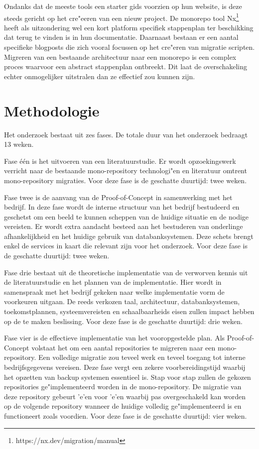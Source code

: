 \documentclass{hogent-article}
\begin{document}
Ondanks dat de meeste tools een starter gids voorzien op hun website, is deze steeds gericht op het cre"eeren van een nieuw project. De monorepo tool Nx\footnote{https://nx.dev/migration/manual} heeft als uitzondering wel een kort platform specifiek stappenplan ter beschikking dat terug te vinden is in hun documentatie. Daarnaast bestaan er een aantal specifieke blogposts die zich vooral focussen op het cre"eren van migratie scripten. Migreren van een bestaande architectuur naar een monorepo is een complex proces waarvoor een abstract stappenplan ontbreekt. Dit laat de overschakeling echter onmogelijker uitstralen dan ze effectief zou kunnen zijn.

\section{Methodologie}
Het onderzoek bestaat uit zes fases. 
De totale duur van het onderzoek bedraagt 13 weken.

Fase \'e\'en is het uitvoeren van een literatuurstudie. Er wordt opzoekingswerk verricht naar de bestaande mono-repository technologi"en en literatuur omtrent mono-repository migraties. Voor deze fase is de geschatte duurtijd: twee weken. 

Fase twee is de aanvang van de Proof-of-Concept in samenwerking met het bedrijf. In deze fase wordt de interne structuur van het bedrijf bestudeerd en geschetst om een beeld te kunnen scheppen van de huidige situatie en de nodige vereisten. Er wordt extra aandacht besteed aan het bestuderen van onderlinge afhankelijkheid en het huidige gebruik van databanksystemen. Deze schets brengt enkel de services in kaart die relevant zijn voor het onderzoek. Voor deze fase is de geschatte duurtijd: twee weken.

Fase drie bestaat uit de theoretische implementatie van de verworven kennis uit de literatuurstudie en het plannen van de implementatie. Hier wordt in samenspraak met het bedrijf gekeken naar welke implementatie vorm de voorkeuren uitgaan. De reeds verkozen taal, architectuur, databanksystemen, toekomstplannen, systeemvereisten en schaalbaarheids eisen zullen impact hebben op de te maken beslissing. Voor deze fase is de geschatte duurtijd: drie weken.

Fase vier is de effectieve implementatie van het vooropgestelde plan. Als Proof-of-Concept volstaat het om een aantal repositories te migreren naar een mono-repository. Een volledige migratie zou teveel werk en teveel toegang tot interne bedrijfsgegevens vereisen. Deze fase vergt een zekere voorbereidingstijd waarbij het opzetten van backup systemen essentieel is. Stap voor stap zullen de gekozen repositories ge"implementeerd worden in de mono-repository. De migratie van deze repository gebeurt 'e'en voor 'e'en waarbij pas overgeschakeld kan worden op de volgende repository wanneer de huidige volledig ge"implementeerd is en functioneert zoals voordien. Voor deze fase is de geschatte duurtijd: vier weken.
\end{document}
